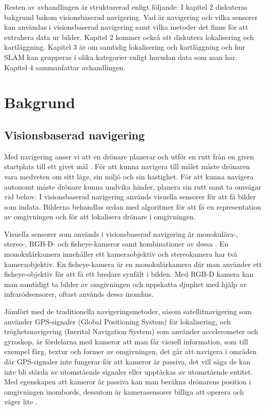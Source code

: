 Resten av avhandlingen är strukturerad enligt följande: I kapitel 2 diskuteras bakgrund bakom visionsbaserad navigering. Vad är navigering och vilka sensorer kan användas i visionsbaserad navigering samt vilka metoder det finns för att extrahera data ur bilder. Kapitel 2 kommer också att diskutera lokalisering och kartläggning. Kapitel 3 är om samtidig lokalisering och kartläggning och hur SLAM kan grupperas i olika kategorier enligt hurudan data som man har. Kapitel 4 sammanfattar avhandlingen.

\chapter{Bakgrund}

\section{Visionsbaserad navigering}

Med navigering anser vi att en drönare planerar och utför en rutt från en given startplats till ett givet mål \citep{geospatial}. För att kunna navigera till målet måste drönaren vara medveten om sitt läge, sin miljö och sin hastighet. För att kunna navigera autonomt måste drönare kunna undvika hinder, planera sin rutt samt ta omvägar vid behov. I visionsbaserad navigering används visuella sensorer för att få bilder som indata. Bilderna behandlas sedan med algoritmer för att få en representation av omgivningen och för att lokalisera drönare i omgivningen. 

Visuella sensorer som används i visionsbaserad navigering är monokulära-, stereo-, RGB-D- och fisheye-kameror samt kombinationer av dessa \citep{geospatial}. En monokulärkamera innehåller ett kameraobjektiv och stereokamera har två kameraobjektiv. En fisheye-kamera är en monokulärkamera där man använder ett fisheye-objektiv för att få ett bredare synfält i bilden. Med RGB-D kamera kan man samtidigt ta bilder av omgivningen och uppskatta djuphet med hjälp av infrarödsensorer, oftast används dessa inomhus. 

Jämfört med de traditionella navigeringsmetoder, såsom satellitnavigering som använder GPS-signaler (Global Positioning System) för lokalisering, och tröghetsnavigering (Inerital Navigation System) som använder accelerometer och gyroskop, är fördelarna med kameror att man får visuell information, som till exempel färg, textur och former av omgivningen, det går att navigera i områden där GPS-signaler inte fungerar för att kameror är passiva, det vill säga de kan inte bli störda av utomstående signaler eller upptäckas av utomstående entitet. Med egenskapen att kameror är passiva kan man beräkna drönarens position i omgivningen inombords, dessutom är kamerasensorer billiga att operera och väger lite \citep{opticalflowuav,geospatial}.

